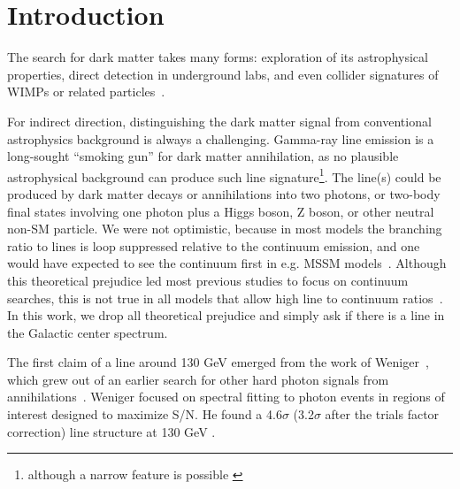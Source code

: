 \documentclass[aps,twocolumn,prd,superscriptaddress,showpacs,nofootinbib,fixfloat]{revtex4}
\begin{document}
\maketitle




\section{Introduction}

The search for dark matter takes many forms: exploration of
its astrophysical properties, direct detection in
underground labs, and even collider signatures of WIMPs or
related
particles~\citep{Jungman:1995df,Bergstrom:2000,Bertone:2005,
Hooper:2007Review, 2012arXiv1205.4882B}.

For indirect direction, distinguishing the dark matter
signal from conventional astrophysics background is always a
challenging. Gamma-ray line emission is a long-sought
``smoking gun'' for dark matter annihilation, as no
plausible astrophysical background can produce such line
signature\footnote{although a narrow feature is possible
\citep[see][]{2012arXiv1207.0458A}}.  The line(s) could be
produced by dark matter decays or annihilations into two
photons, or two-body final states involving one photon plus
a Higgs boson, Z boson, or other neutral non-SM
particle. We were not optimistic, because in most models the
branching ratio to lines is loop suppressed relative to the
continuum emission, and one would have expected to see the
continuum first in e.g. MSSM
models~\citep[e.g.][]{Bergstrom:1997}.  Although this
theoretical prejudice led most previous studies to focus on
continuum searches, this is not true in all models that
allow high line to continuum
ratios~\citep[e.g.][]{Bergstrom:1998,Bergstrom:2000,Bertone:2009,Jackson:2010,Cline:2012,Weiner:2012}.
In this work, we drop all theoretical prejudice and simply
ask if there is a line in the Galactic center spectrum.

The first claim of a line around 130 GeV emerged from the
work of Weniger~\citep{Weniger:2012}, which grew out of an
earlier search for other hard photon signals from
annihilations~\citep{Bringmann:2012}.  Weniger focused on
spectral fitting to photon events in regions of interest
designed to maximize S/N.  He found a 4.6$\sigma$
(3.2$\sigma$ after the trials factor correction) line
structure at 130 GeV .
\end{document}
